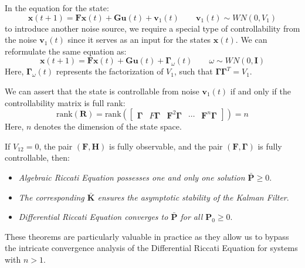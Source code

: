 In the equation for the state:
\[\mathbf{x}(t+1)=\mathbf{Fx}(t)+\mathbf{Gu}(t)+\mathbf{v}_1(t) \qquad \mathbf{v}_1(t)\sim WN(0,V_1)\]
to introduce another noise source, we require a special type of controllability from the noise $\mathbf{v}_1(t)$ since it serves as an input for the states $\mathbf{x}(t)$. 
We can reformulate the same equation as:
\[\mathbf{x}(t+1)=\mathbf{Fx}(t)+\mathbf{Gu}(t)+\boldsymbol{\Gamma}_\omega(t) \qquad \omega\sim WN(0,\mathbf{I})\]
Here, $\boldsymbol{\Gamma}_\omega(t)$ represents the factorization of $V_1$, such that $\boldsymbol{\Gamma\Gamma}^T=V_1$.

We can assert that the state is controllable from noise $\mathbf{v}_1(t)$ if and only if the controllability matrix is full rank:
\[\text{rank}(\mathbf{R})=\text{rank}\left(\begin{bmatrix} \boldsymbol{\Gamma} & F\boldsymbol{\Gamma} & \mathbf{F}^2\boldsymbol{\Gamma} & \cdots & \mathbf{F}^n\boldsymbol{\Gamma} \end{bmatrix} \right)=n\]
Here, $n$ denotes the dimension of the state space.
\begin{theorem}
    If $V_{12}=0$, the pair $(\mathbf{F},\mathbf{H})$ is fully observable, and the pair $(\mathbf{F},\boldsymbol{\Gamma})$ is fully controllable, then:
\end{theorem}  
\begin{itemize}
    \item \textit{Algebraic Riccati Equation possesses one and only one solution $\bar{\mathbf{P}}\geq 0$}. 
    \item \textit{The corresponding $\bar{\mathbf{K}}$ ensures the asymptotic stability of the Kalman Filter}. 
    \item \textit{Differential Riccati Equation converges to $\bar{\mathbf{P}}$ for all $\mathbf{P}_0\geq 0$}. 
\end{itemize}
These theorems are particularly valuable in practice as they allow us to bypass the intricate convergence analysis of the Differential Riccati Equation for systems with $n>1$.